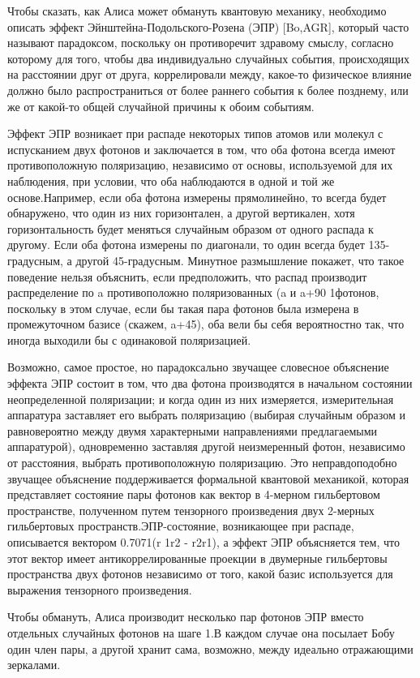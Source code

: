 Чтобы ­­сказать, как Алиса может обмануть квантовую механику, необходимо описать эффект Эйнштейна-Подольского-Розена (ЭПР) [Bo,AGR], который часто называют парадоксом, поскольку он противоречит здравому смыслу, согласно которому для того, чтобы два индивидуально случайных события, происходящих на расстоянии друг от друга, коррелировали между, какое-то физическое влияние должно было распространиться от более раннего события к более позднему, или же от какой-то общей случайной причины к обоим событиям.

­­­­Эффект ЭПР возникает при распаде некоторых типов атомов или молекул с испусканием двух фотонов и заключается в том, что оба фотона всегда имеют противоположную поляризацию, независимо от основы, используемой для их наблюдения, при условии, что оба наблюдаются в одной и той же основе.Например, если оба фотона измерены прямолинейно, то всегда будет обнаружено, что один из них горизонтален, а другой вертикален, хотя горизонтальность будет меняться случайным образом от одного распада к другому. Если оба фотона измерены по диагонали, то один всегда будет 135-градусным, а другой 45-градусным. Минутное размышление покажет, что такое поведение нельзя объяснить, если предположить, что распад производит распределение по a противоположно поляризованных (a и a+90 1фотонов, поскольку в этом случае, если бы такая пара фотонов была измерена в промежуточном базисе (скажем, a+45), оба вели бы себя вероятностно так, что иногда выходили бы с одинаковой поляризацией.

­­­­Возможно, самое простое, но парадоксально звучащее словесное объяснение эффекта ЭПР состоит в том, что два фотона производятся в начальном состоянии неопределенной поляризации; и когда один из них измеряется, измерительная аппаратура заставляет его выбрать поляризацию (выбирая случайным образом и равновероятно между двумя характерными направлениями предлагаемыми аппаратурой), одновременно заставляя другой неизмеренный фотон, независимо от расстояния, выбрать противоположную поляризацию. Это неправдоподобно звучащее объяснение поддерживается формальной квантовой механикой, которая представляет состояние пары фотонов как вектор в 4-мерном гильбертовом пространстве, полученном путем тензорного произведения двух 2-мерных гильбертовых пространств.ЭПР-состояние, возникающее при распаде, описывается вектором 0.7071(r 1r2 - r2r1), а эффект ЭПР объясняется тем, что этот вектор имеет антикоррелированные проекции в двумерные гильбертовы пространства двух фотонов независимо от того, какой базис используется для выражения тензорного произведения.

­­­Чтобы обмануть, Алиса производит несколько пар фотонов ЭПР вместо отдельных случайных фотонов на шаге 1.В каждом случае она посылает Бобу один член пары, а другой хранит сама, возможно, между идеально отражающими зеркалами.

\subsection{\review}

\subsection{\dic}
